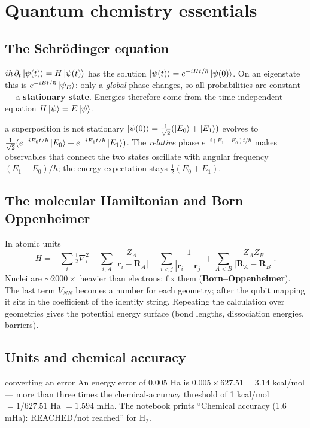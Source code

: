 \documentclass[11pt,a4paper,openany]{book}
\newcounter{wex}[chapter]
\begin{document}
\section{Quantum chemistry essentials}
\subsection{The Schr\"odinger equation}
$i\hbar\,\partial_t\ket{\psi(t)} = H\ket{\psi(t)}$ has the solution $\ket{\psi(t)} = e^{-iHt/\hbar}\ket{\psi(0)}$. On an eigenstate this is $e^{-iEt/\hbar}\ket{\psi_E}$: only a
\emph{global} phase changes, so all probabilities are constant --- a \textbf{stationary state}. Energies therefore come from the
time-independent equation $H\ket\psi = E\ket\psi$.
\begin{wexample}{a superposition is not stationary}
$\ket{\psi(0)} = \frac{1}{\sqrt2}(\ket{E_0} + \ket{E_1})$ evolves to $\frac{1}{\sqrt2}(e^{-iE_0t/\hbar}\ket{E_0} + e^{-iE_1t/\hbar}\ket{E_1})$. The \emph{relative} phase $e^{-i(E_1 - E_0)t/\hbar}$
makes observables that connect the two states oscillate with angular frequency $(E_1 - E_0)/\hbar$; the energy expectation stays
$\frac12(E_0 + E_1)$.
\end{wexample}

\subsection{The molecular Hamiltonian and Born--Oppenheimer}
In atomic units
\[ H = -\sum_i\tfrac12\nabla_i^2 - \sum_{i,A}\frac{Z_A}{|\mathbf r_i - \mathbf R_A|} + \sum_{i<j}\frac{1}{|\mathbf r_i - \mathbf r_j|} + \sum_{A<B}\frac{Z_AZ_B}{|\mathbf R_A - \mathbf R_B|}. \]
Nuclei are $\sim2000\times$ heavier than electrons: fix them (\textbf{Born--Oppenheimer}). The last term $V_{NN}$ becomes a number for each geometry;
after the qubit mapping it sits in the coefficient of the identity string. Repeating the calculation over geometries gives the
potential energy surface (bond lengths, dissociation energies, barriers).

\subsection{Units and chemical accuracy}
\begin{wexample}{converting an error}
An energy error of $0.005$ Ha is $0.005\times627.51 = 3.14$ kcal/mol --- more than three times the chemical-accuracy threshold of
1 kcal/mol $= 1/627.51$ Ha $= 1.594$ mHa. The notebook prints ``Chemical accuracy (1.6 mHa): REACHED/not reached'' for H$_2$.
\end{wexample}
\end{document}
